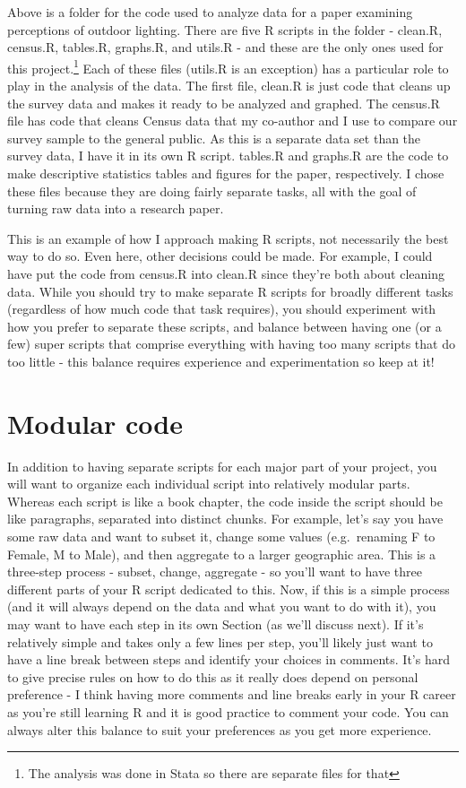 \documentclass[
]{krantz}
\begin{document}
Above is a folder for the code used to analyze data for a paper examining perceptions of outdoor lighting. There are five R scripts in the folder - clean.R, census.R, tables.R, graphs.R, and utils.R - and these are the only ones used for this project.\footnote{The analysis was done in Stata so there are separate files for that} Each of these files (utils.R is an exception) has a particular role to play in the analysis of the data. The first file, clean.R is just code that cleans up the survey data and makes it ready to be analyzed and graphed. The census.R file has code that cleans Census data that my co-author and I use to compare our survey sample to the general public. As this is a separate data set than the survey data, I have it in its own R script. tables.R and graphs.R are the code to make descriptive statistics tables and figures for the paper, respectively. I chose these files because they are doing fairly separate tasks, all with the goal of turning raw data into a research paper.

This is an example of how I approach making R scripts, not necessarily the best way to do so. Even here, other decisions could be made. For example, I could have put the code from census.R into clean.R since they're both about cleaning data. While you should try to make separate R scripts for broadly different tasks (regardless of how much code that task requires), you should experiment with how you prefer to separate these scripts, and balance between having one (or a few) super scripts that comprise everything with having too many scripts that do too little - this balance requires experience and experimentation so keep at it!

\hypertarget{modular-code}{%
\section{Modular code}\label{modular-code}}

In addition to having separate scripts for each major part of your project, you will want to organize each individual script into relatively modular parts. Whereas each script is like a book chapter, the code inside the script should be like paragraphs, separated into distinct chunks. For example, let's say you have some raw data and want to subset it, change some values (e.g.~renaming F to Female, M to Male), and then aggregate to a larger geographic area. This is a three-step process - subset, change, aggregate - so you'll want to have three different parts of your R script dedicated to this. Now, if this is a simple process (and it will always depend on the data and what you want to do with it), you may want to have each step in its own Section (as we'll discuss next). If it's relatively simple and takes only a few lines per step, you'll likely just want to have a line break between steps and identify your choices in comments. It's hard to give precise rules on how to do this as it really does depend on personal preference - I think having more comments and line breaks early in your R career as you're still learning R and it is good practice to comment your code. You can always alter this balance to suit your preferences as you get more experience.
\end{document}
